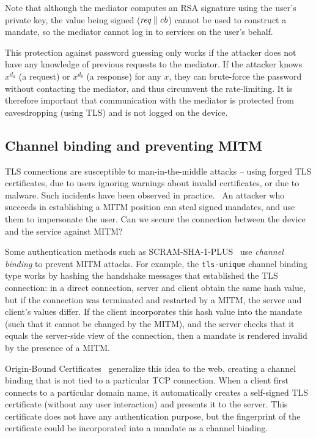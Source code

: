 Note that although the mediator computes an RSA signature using the user's private key, the value
being signed ($\mathit{req} \mathbin{\|} \mathit{cb}$) cannot be used to construct a mandate, so the
mediator cannot log in to services on the user's behalf.

This protection against password guessing only works if the attacker does not have any knowledge of
previous requests to the mediator. If the attacker knows $x^{d_a}$ (a request) or $x^{d_b}$ (a
response) for any $x$, they can brute-force the password without contacting the mediator, and thus
circumvent the rate-limiting.  It is therefore important that communication with the mediator is
protected from eavesdropping (using TLS) and is not logged on the device.

\subsection{Channel binding and preventing MITM}\label{sec:channelbinding}

TLS connections are susceptible to man-in-the-middle attacks -- using forged TLS certificates, due
to users ignoring warnings about invalid certificates, or due to malware. Such incidents have been
observed in practice.~\cite{Huang14, Adkins11} An attacker who succeeds in establishing a MITM
position can steal signed mandates, and use them to impersonate the user. Can we secure the
connection between the device and the service against MITM?

Some authentication methods such as SCRAM-SHA-1-PLUS~\cite{SCRAM} use \emph{channel binding} to
prevent MITM attacks. For example, the \texttt{tls-unique} channel binding type works by hashing the
handshake messages that established the TLS connection: in a direct connection, server and client
obtain the same hash value, but if the connection was terminated and restarted by a MITM, the server
and client's values differ. If the client incorporates this hash value into the mandate (such that
it cannot be changed by the MITM), and the server checks that it equals the server-side view of the
connection, then a mandate is rendered invalid by the presence of a MITM.

Origin-Bound Certificates~\cite{Dietz12} generalize this idea to the web, creating a channel
binding that is not tied to a particular TCP connection. When a client first connects to a
particular domain name, it automatically creates a self-signed TLS certificate (without any user
interaction) and presents it to the server. This certificate does not have any authentication
purpose, but the fingerprint of the certificate could be incorporated into a mandate as a channel
binding.

